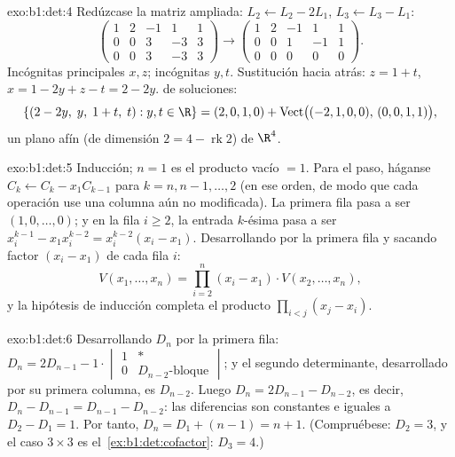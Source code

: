 \begin{solution}{exo:b1:det:4}
Redúzcase la matriz ampliada: $L_2 \leftarrow L_2 - 2L_1$,
$L_3 \leftarrow L_3 - L_1$:
\[
\begin{pmatrix}
1 & 2 & -1 & 1 & 1\\
0 & 0 & 3 & -3 & 3\\
0 & 0 & 3 & -3 & 3
\end{pmatrix}
\to
\begin{pmatrix}
1 & 2 & -1 & 1 & 1\\
0 & 0 & 1 & -1 & 1\\
0 & 0 & 0 & 0 & 0
\end{pmatrix}.
\]
Incógnitas principales $x, z$; incógnitas  $y, t$. Sustitución
hacia atrás: $z = 1 + t$, $x = 1 - 2y + z - t = 2 - 2y$. 
de soluciones:
\[
\{(2 - 2y,\; y,\; 1 + t,\; t) : y, t \in \R\}
= (2, 0, 1, 0) + \operatorname{Vect}\bigl((-2,1,0,0),\,
(0,0,1,1)\bigr),
\]
un plano afín (de dimensión $2 = 4 - \operatorname{rk} 2$) de $\R^4$.
\end{solution}

\begin{solution}{exo:b1:det:5}
Inducción; $n = 1$ es el producto vacío $= 1$. Para el paso, háganse
$C_k \leftarrow C_k - x_1 C_{k-1}$ para $k = n, n-1, \dots, 2$ (en
ese orden, de modo que cada operación use una columna aún no
modificada). La primera fila pasa a ser $(1, 0, \dots, 0)$; y en la
fila $i \geq 2$, la entrada $k$-ésima pasa a ser
$x_i^{k-1} - x_1 x_i^{k-2} = x_i^{k-2}(x_i - x_1)$. Desarrollando por
la primera fila y sacando factor $(x_i - x_1)$ de cada fila $i$:
\[
V(x_1, \dots, x_n)
= \prod_{i=2}^{n} (x_i - x_1)\cdot V(x_2, \dots, x_n),
\]
y la hipótesis de inducción completa el producto
$\prod_{i<j}(x_j - x_i)$.
\end{solution}

\begin{solution}{exo:b1:det:6}
Desarrollando $D_n$ por la primera fila:
$D_n = 2 D_{n-1} - 1\cdot\begin{vmatrix} 1 & \ast\\ 0 &
D_{n-2}\text{-bloque} \end{vmatrix}$; y el segundo determinante,
desarrollado por su primera columna, es $D_{n-2}$. Luego
$D_n = 2D_{n-1} - D_{n-2}$, es decir,
$D_n - D_{n-1} = D_{n-1} - D_{n-2}$: las diferencias son constantes e
iguales a $D_2 - D_1 = 1$. Por tanto, $D_n = D_1 + (n - 1) = n + 1$.
(Compruébese: $D_2 = 3$, y el caso $3\times3$ es
el~\cref{ex:b1:det:cofactor}: $D_3 = 4$.)
\end{solution}

